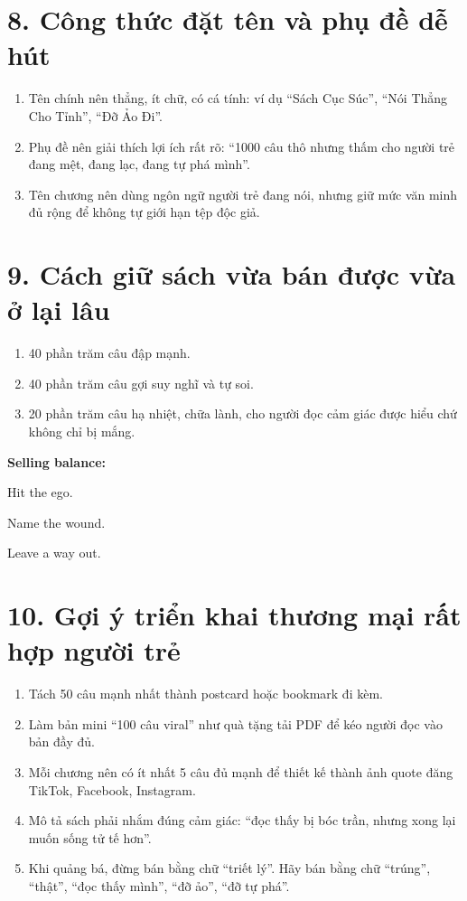 \section{8. Công thức đặt tên và phụ đề dễ hút}
\begin{enumerate}[leftmargin=*]
\item Tên chính nên thẳng, ít chữ, có cá tính: ví dụ ``Sách Cục Súc'', ``Nói Thẳng Cho Tỉnh'', ``Đỡ Ảo Đi''.
\item Phụ đề nên giải thích lợi ích rất rõ: ``1000 câu thô nhưng thấm cho người trẻ đang mệt, đang lạc, đang tự phá mình''.
\item Tên chương nên dùng ngôn ngữ người trẻ đang nói, nhưng giữ mức văn minh đủ rộng để không tự giới hạn tệp độc giả.
\end{enumerate}

\section{9. Cách giữ sách vừa bán được vừa ở lại lâu}
\begin{enumerate}[leftmargin=*]
\item 40 phần trăm câu đập mạnh.
\item 40 phần trăm câu gợi suy nghĩ và tự soi.
\item 20 phần trăm câu hạ nhiệt, chữa lành, cho người đọc cảm giác được hiểu chứ không chỉ bị mắng.
\end{enumerate}

\begin{ghinhoanh}
\textbf{Selling balance:}

Hit the ego.

Name the wound.

Leave a way out.
\end{ghinhoanh}

\section{10. Gợi ý triển khai thương mại rất hợp người trẻ}
\begin{enumerate}[leftmargin=*]
\item Tách 50 câu mạnh nhất thành postcard hoặc bookmark đi kèm.
\item Làm bản mini ``100 câu viral'' như quà tặng tải PDF để kéo người đọc vào bản đầy đủ.
\item Mỗi chương nên có ít nhất 5 câu đủ mạnh để thiết kế thành ảnh quote đăng TikTok, Facebook, Instagram.
\item Mô tả sách phải nhắm đúng cảm giác: ``đọc thấy bị bóc trần, nhưng xong lại muốn sống tử tế hơn''.
\item Khi quảng bá, đừng bán bằng chữ ``triết lý''. Hãy bán bằng chữ ``trúng'', ``thật'', ``đọc thấy mình'', ``đỡ ảo'', ``đỡ tự phá''.
\end{enumerate}

